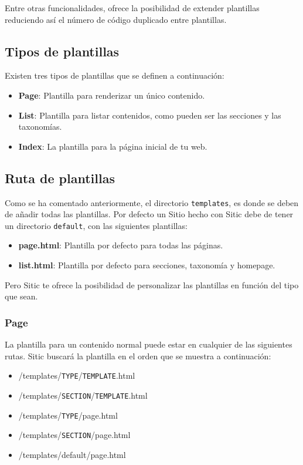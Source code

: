 Entre otras funcionalidades, ofrece la posibilidad de extender plantillas reduciendo así el número de
código duplicado entre plantillas.

\subsection{Tipos de plantillas}

Existen tres tipos de plantillas que se definen a continuación:

\begin{itemize}
    \item \textbf{Page}: Plantilla para renderizar un único contenido.
    \item \textbf{List}: Plantilla para listar contenidos, como pueden ser las secciones y las taxonomías.
    \item \textbf{Index}: La plantilla para la página inicial de tu web.
\end{itemize}

\subsection{Ruta de plantillas}

Como se ha comentado anteriormente, el directorio \texttt{templates}, es donde se deben de añadir todas
las plantillas. Por defecto un Sitio hecho con Sitic debe de tener un directorio \texttt{default}, con las
siguientes plantillas:

\begin{itemize}
    \item \textbf{page.html}: Plantilla por defecto para todas las páginas.
    \item \textbf{list.html}: Plantilla por defecto para secciones, taxonomía y homepage.
\end{itemize}

Pero Sitic te ofrece la posibilidad de personalizar las plantillas en función del tipo que sean.

\subsubsection{Page}

La plantilla para un contenido normal puede estar en cualquier de las siguientes rutas. Sitic buscará
la plantilla en el orden que se muestra a continuación:

\begin{itemize}
    \item /templates/\texttt{TYPE}/\texttt{TEMPLATE}.html
    \item /templates/\texttt{SECTION}/\texttt{TEMPLATE}.html
    \item /templates/\texttt{TYPE}/page.html
    \item /templates/\texttt{SECTION}/page.html
    \item /templates/default/page.html
\end{itemize}

